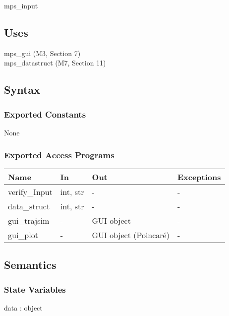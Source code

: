 \documentclass[12pt, titlepage]{article}
\begin{document}
mps\_input

\subsection{Uses}

mps\_gui (M3, Section 7)\\
mps\_datastruct (M7, Section 11) 

\subsection{Syntax}

\subsubsection{Exported Constants}

None

\subsubsection{Exported Access Programs}

\begin{center}
\begin{tabular}{p{2cm} p{4cm} p{4cm} p{2cm}}
\hline
\textbf{Name} & \textbf{In} & \textbf{Out} & \textbf{Exceptions} \\
\hline
verify\_Input & int, str & - & - \\
data\_struct & int, str & - & - \\
gui\_trajsim & - & GUI object & - \\
gui\_plot & - & GUI object (Poincar\'{e}) & - \\
\hline
\end{tabular}
\end{center}

\subsection{Semantics}

\subsubsection{State Variables}

data : object 
\end{document}
